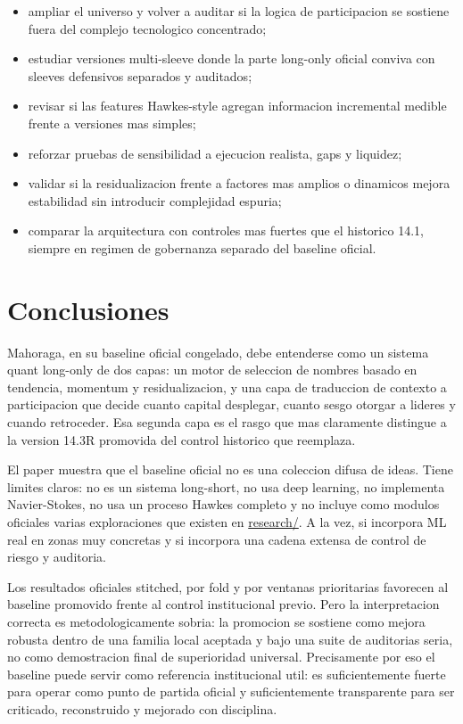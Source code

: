 \documentclass[11pt,letterpaper]{article}
\newcommand{\code}[1]{{\urlstyle{tt}\url{#1}}}
\begin{document}
\begin{itemize}
    \item ampliar el universo y volver a auditar si la logica de participacion se sostiene fuera del complejo tecnologico concentrado;
    \item estudiar versiones multi-sleeve donde la parte long-only oficial conviva con sleeves defensivos separados y auditados;
    \item revisar si las features Hawkes-style agregan informacion incremental medible frente a versiones mas simples;
    \item reforzar pruebas de sensibilidad a ejecucion realista, gaps y liquidez;
    \item validar si la residualizacion frente a factores mas amplios o dinamicos mejora estabilidad sin introducir complejidad espuria;
    \item comparar la arquitectura con controles mas fuertes que el historico 14.1, siempre en regimen de gobernanza separado del baseline oficial.
\end{itemize}

\section{Conclusiones}
Mahoraga, en su baseline oficial congelado, debe entenderse como un sistema quant long-only de dos capas: un motor de seleccion de nombres basado en tendencia, momentum y residualizacion, y una capa de traduccion de contexto a participacion que decide cuanto capital desplegar, cuanto sesgo otorgar a lideres y cuando retroceder. Esa segunda capa es el rasgo que mas claramente distingue a la version 14.3R promovida del control historico que reemplaza.

El paper muestra que el baseline oficial no es una coleccion difusa de ideas. Tiene limites claros: no es un sistema long-short, no usa deep learning, no implementa Navier-Stokes, no usa un proceso Hawkes completo y no incluye como modulos oficiales varias exploraciones que existen en \code{research/}. A la vez, si incorpora ML real en zonas muy concretas y si incorpora una cadena extensa de control de riesgo y auditoria.

Los resultados oficiales stitched, por fold y por ventanas prioritarias favorecen al baseline promovido frente al control institucional previo. Pero la interpretacion correcta es metodologicamente sobria: la promocion se sostiene como mejora robusta dentro de una familia local aceptada y bajo una suite de auditorias seria, no como demostracion final de superioridad universal. Precisamente por eso el baseline puede servir como referencia institucional util: es suficientemente fuerte para operar como punto de partida oficial y suficientemente transparente para ser criticado, reconstruido y mejorado con disciplina.
\end{document}
